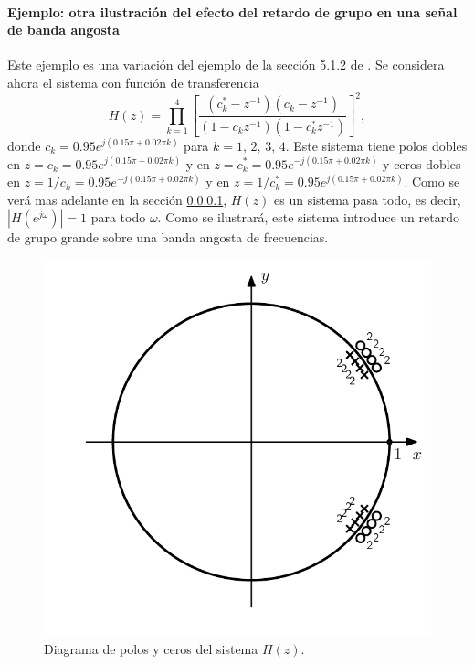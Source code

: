 \documentclass[a4paper]{report}
\begin{document}
\paragraph{Ejemplo: otra ilustración del efecto del retardo de grupo en una señal de banda angosta} Este ejemplo es una variación del ejemplo de la sección 5.1.2 de \cite{oppenheim2009discrete}. Se considera ahora el sistema con función de transferencia
\begin{equation}\label{eq:transform_analysis_example_5_1_2_system_function}
 H(z)=\prod_{k=1}^4\left[\frac{(c^*_k-z^{-1})(c_k-z^{-1})}{(1-c_kz^{-1})(1-c^*_kz^{-1})}\right]^2, 
\end{equation}
donde \(c_k=0.95e^{j(0.15\pi+0.02\pi k)}\) para \(k=1,\,2,\,3,\,4\). Este sistema tiene polos dobles en \(z=c_k=0.95e^{j(0.15\pi+0.02\pi k)}\) y en \(z=c^*_k=0.95e^{-j(0.15\pi+0.02\pi k)}\) y ceros dobles en \(z=1/c_k=0.95e^{-j(0.15\pi+0.02\pi k)}\) y en \(z=1/c^*_k=0.95e^{j(0.15\pi+0.02\pi k)}\). Como se verá mas adelante en la sección \ref{}, \(H(z)\) es un sistema pasa todo, es decir, \(|H(e^{j\omega})|=1\) para todo \(\omega\). Como se ilustrará, este sistema introduce un retardo de grupo grande sobre una banda angosta de frecuencias.
 \begin{figure}[!htb]
  \begin{minipage}[c]{0.53\textwidth}
    \includegraphics[width=\textwidth]{figuras/transform_analysis_example_5_1_2_group_delay_poles_zeros_plot.pdf}
  \end{minipage}\hfill
  \begin{minipage}[c]{0.38\textwidth}
    \caption{
     Diagrama de polos y ceros del sistema \(H(z)\).
    }\label{fig:transform_analysis_example_5_1_2_group_delay_poles_zeros_plot}
  \end{minipage}
\end{figure}
\end{document}
